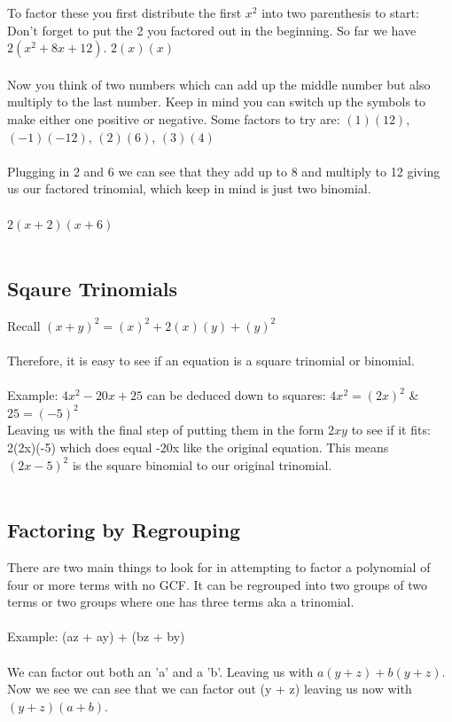 To factor these you first distribute the first $x^2$ into two parenthesis to start:\\ Don't forget to put the 2 you factored out in the beginning. So far we have $2(x^2 + 8x + 12)$.
	$2(x )(x )$\\
\\
Now you think of two numbers which can add up the middle number but also multiply to the last number. Keep in mind you can switch up the symbols to make either one positive or negative. Some factors to try are:
$(1)(12)$, $(-1)(-12)$, $(2)(6)$, $(3)(4)$\\
\\
Plugging in 2 and 6 we can see that they add up to 8 and multiply to 12 giving us our factored trinomial, which keep in mind is just two binomial.\\
\\
$2(x + 2)(x + 6)$\\
\\
\subsection{Sqaure Trinomials}
Recall $(x + y)^2 = (x)^2 + 2(x)(y) + (y)^2$\\
\\
Therefore, it is easy to see if an equation is a square trinomial or binomial.\\
\\
Example: $4x^2 - 20x + 25$ can be deduced down to squares: $4x^2 = (2x)^2$ \& $25 = (-5)^2$\\
Leaving us with the final step of putting them in the form $2xy$ to see if it fits: 2(2x)(-5) which does equal -20x like the original equation. This means $(2x - 5)^2$ is the square binomial to our original trinomial.\\
\\

\subsection{Factoring by Regrouping}
There are two main things to look for in attempting to factor a polynomial of four or more terms with no GCF. It can be regrouped into two groups of two terms or two groups where one has three terms aka a trinomial. \\
\\
Example: (az + ay) + (bz + by)\\
\\
We can factor out both an 'a' and a 'b'. Leaving us with $a(y + z) + b(y + z)$. Now we see we can see that we can factor out (y + z) leaving us now with $(y + z)(a + b)$. \\


